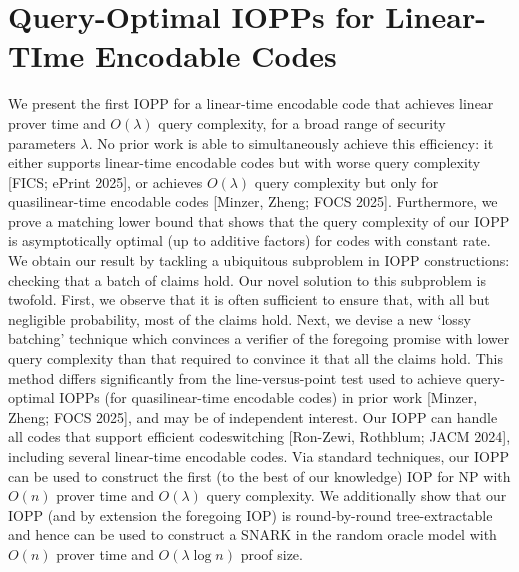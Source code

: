 \documentclass[11pt,oneside]{book}
\theoremstyle{definition}
\theoremstyle{remark}
\theoremstyle{plain}
\begin{document}
\section{\cite{cryptoeprint:2025/1588} Query-Optimal IOPPs for Linear-TIme Encodable Codes}
We present the first IOPP for a linear-time encodable code that achieves linear prover time and $O(\lambda)$ query complexity, for a broad range of security parameters $\lambda$. No prior work is able to simultaneously achieve this efficiency: it either supports linear-time encodable codes but with worse query complexity [FICS; ePrint 2025], or achieves $O(\lambda)$ query complexity but only for quasilinear-time encodable codes [Minzer, Zheng; FOCS 2025]. Furthermore, we prove a matching lower bound that shows that the query complexity of our IOPP is asymptotically optimal (up to additive factors) for codes with constant rate. We obtain our result by tackling a ubiquitous subproblem in IOPP constructions: checking that a batch of claims hold. Our novel solution to this subproblem is twofold. First, we observe that it is often sufficient to ensure that, with all but negligible probability, most of the claims hold. Next, we devise a new `lossy batching' technique which convinces a verifier of the foregoing promise with lower query complexity than that required to convince it that all the claims hold. This method differs significantly from the line-versus-point test used to achieve query-optimal IOPPs (for quasilinear-time encodable codes) in prior work [Minzer, Zheng; FOCS 2025], and may be of independent interest. Our IOPP can handle all codes that support efficient codeswitching [Ron-Zewi, Rothblum; JACM 2024], including several linear-time encodable codes. Via standard techniques, our IOPP can be used to construct the first (to the best of our knowledge) IOP for NP with $O(n)$ prover time and $O(\lambda)$ query complexity. We additionally show that our IOPP (and by extension the foregoing IOP) is round-by-round tree-extractable and hence can be used to construct a SNARK in the random oracle model with $O(n)$ prover time and $O(\lambda \log n)$ proof size.


\cite{cryptoeprint:2024/474} 
\end{document}
